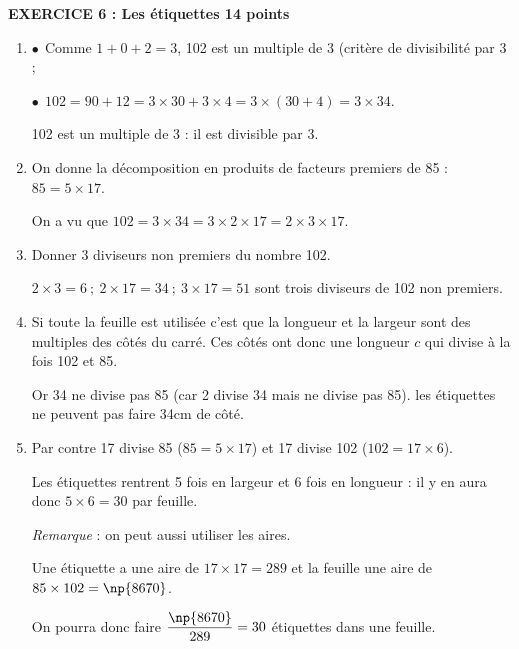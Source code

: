 \textbf{EXERCICE 6 : Les étiquettes \hfill 14 points}

\medskip
 
\begin{enumerate}
\item %
$\bullet~~$Comme $1 + 0 + 2 = 3$, 102 est un multiple de 3 (critère de divisibilité par 3 ;

$\bullet~~$$102 = 90 + 12 = 3\times 30 + 3 \times 4 = 3\times (30 + 4) = 3\times 34$.

102 est un multiple de 3  : il est divisible par 3.
\item On donne la décomposition en produits de facteurs premiers de 85 : $85 = 5 \times 17$.

On a vu que $102 = 3 \times 34 = 3 \times 2 \times 17 = 2 \times 3 \times 17$.
\item Donner 3 diviseurs non premiers du nombre 102.

$2 \times 3 = 6 \:;\:  2 \times 17 = 34 \:;\: 3 \times 17 = 51$ sont trois diviseurs de 102 non premiers. 

%
%
\item %
Si toute la feuille est utilisée c'est que la longueur et la largeur sont des multiples des côtés du carré. Ces côtés ont donc une  longueur $c$ qui divise à la fois 102 et 85.

Or 34 ne divise pas 85 (car 2 divise 34 mais ne divise pas 85). les étiquettes ne peuvent pas faire 34cm de côté.
\item %

Par contre 17 divise 85 ($85 = 5 \times 17$) et 17 divise 102 ($102 = 17 \times 6$).

Les étiquettes rentrent 5 fois en largeur et 6 fois en longueur : il y en aura donc $5 \times 6 = 30$ par feuille.

\emph{Remarque } : on peut aussi utiliser les aires.

Une étiquette a une aire de $17 \times 17 = 289$ et la feuille une aire de $85 \times 102 = \np{8670}$.

On pourra donc faire $\dfrac{\np{8670}}{289} = 30$ étiquettes dans une feuille.
\end{enumerate}

\vspace{0,5cm}

